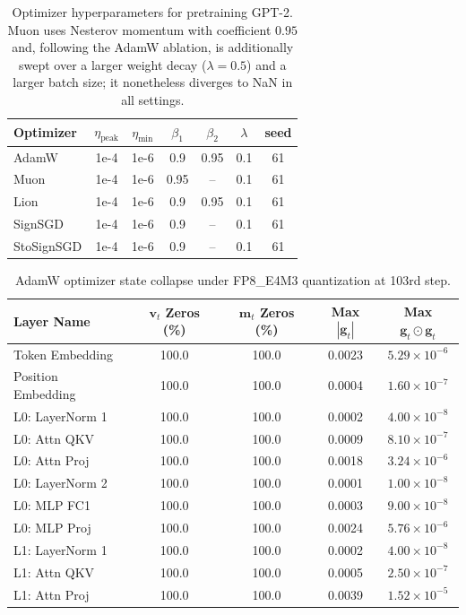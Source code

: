 \documentclass{article}
\def \v {\mathbf{v}}
\def \g {\mathbf{g}}
\def \m {\mathbf{m}}
\begin{document}
\begin{table}[t]
\centering
\caption{Optimizer hyperparameters for pretraining GPT-2. Muon uses Nesterov momentum with coefficient $0.95$ and, following the AdamW ablation, is additionally swept over a larger weight decay ($\lambda=0.5$) and a larger batch size; it nonetheless diverges to NaN in all settings.\label{tab:optimizer-hp-gpt2}}
\centering
\begin{tabular}{lcccccc}
\toprule
\textbf{Optimizer} & $\eta_\text{peak}$ &$\eta_\text{min}$ & $\beta_1$ & $\beta_2$ & $\lambda$ & seed\\
\midrule
AdamW   & 1e-4 & 1e-6 & 0.9 & 0.95 & 0.1 & 61\\
Muon   & 1e-4 & 1e-6 & 0.95 & -- & 0.1 & 61\\
Lion   & 1e-4 & 1e-6 & 0.9 & 0.95 & 0.1 & 61\\
SignSGD & 1e-4 & 1e-6 & 0.9 & -- & 0.1  & 61\\
StoSignSGD & 1e-4 & 1e-6 & 0.9 & -- & 0.1 & 61\\
\bottomrule
\end{tabular}
\end{table}

\begin{table}[htbp]
\centering
\caption{AdamW optimizer state collapse under FP8\_E4M3 quantization at 103rd step. }
\label{tab:adamw_collapse}
\begin{tabular}{lcccc}
\toprule
\textbf{Layer Name} & \textbf{$\v_t$ Zeros (\%)} & \textbf{$\m_t$ Zeros (\%)} & \textbf{Max $|\g_t|$} & \textbf{Max $\g_t\odot\g_t$} \\
\midrule
Token Embedding     & 100.0 & 100.0 & 0.0023 & $5.29 \times 10^{-6}$ \\
Position Embedding  & 100.0 & 100.0 & 0.0004 & $1.60 \times 10^{-7}$ \\
L0: LayerNorm 1     & 100.0 & 100.0 & 0.0002 & $4.00 \times 10^{-8}$ \\
L0: Attn QKV        & 100.0 & 100.0 & 0.0009 & $8.10 \times 10^{-7}$ \\
L0: Attn Proj       & 100.0 & 100.0 & 0.0018 & $3.24 \times 10^{-6}$ \\
L0: LayerNorm 2     & 100.0 & 100.0 & 0.0001 & $1.00 \times 10^{-8}$ \\
L0: MLP FC1         & 100.0 & 100.0 & 0.0003 & $9.00 \times 10^{-8}$ \\
L0: MLP Proj        & 100.0 & 100.0 & 0.0024 & $5.76 \times 10^{-6}$ \\
L1: LayerNorm 1     & 100.0 & 100.0 & 0.0002 & $4.00 \times 10^{-8}$ \\
L1: Attn QKV        & 100.0 & 100.0 & 0.0005 & $2.50 \times 10^{-7}$ \\
L1: Attn Proj       & 100.0 & 100.0 & 0.0039 & $1.52 \times 10^{-5}$ \\
\bottomrule
\end{tabular}
\end{table}
\end{document}

